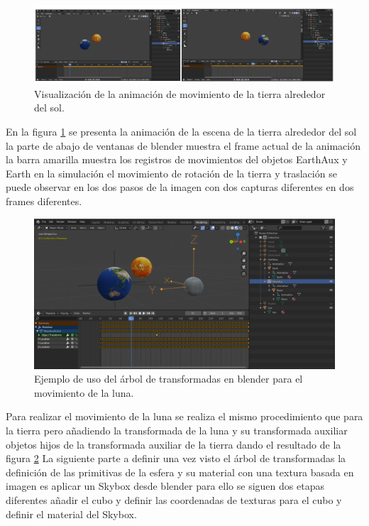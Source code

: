 \documentclass[a4paper]{book}
\begin{document}
\begin{figure}[H]
    \centering
    \includegraphics[width=15cm, keepaspectratio]{img/AnimationBlender.png}
    \caption{Visualización de la animación de movimiento de la tierra alrededor del sol.}
    \label{AnimationBlender}
\end{figure}

En la figura \ref{AnimationBlender} se presenta la animación de la escena de la tierra alrededor del sol la parte de abajo de ventanas de blender
muestra el frame actual de la animación la barra amarilla muestra los registros de movimientos del objetos EarthAux y Earth en
la simulación el movimiento de rotación de la tierra y traslación se puede observar en los dos pasos de la imagen con dos
capturas diferentes en dos frames diferentes.

\begin{figure}[H]
    \centering
    \includegraphics[width=14cm, keepaspectratio]{img/MoonAux.png}
    \caption{Ejemplo de uso del árbol de transformadas en blender para el movimiento de la luna.}
    \label{MoonAux}
\end{figure}

Para realizar el movimiento de la luna se realiza el mismo procedimiento que para la tierra pero añadiendo la transformada de la
luna y su transformada auxiliar objetos hijos de la transformada auxiliar de la tierra dando el resultado de la figura \ref{MoonAux} La
siguiente parte a definir una vez visto el árbol de transformadas la definición de las primitivas de la esfera y su material con
una textura basada en imagen es aplicar un Skybox desde blender para ello se siguen dos etapas diferentes añadir el cubo y definir
las coordenadas de texturas para el cubo y definir el material del Skybox.
\end{document}
